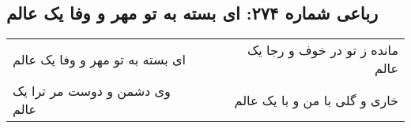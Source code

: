 \begin{center}
\section*{رباعی شماره ۲۷۴: ای بسته به تو مهر و وفا یک عالم}
\label{sec:sh274}
\begin{longtable}{l p{0.5cm} r}
ای بسته به تو مهر و وفا یک عالم
&&
مانده ز تو در خوف و رجا یک عالم
\\
وی دشمن و دوست مر ترا یک عالم
&&
خاری و گلی با من و با یک عالم
\\
\end{longtable}
\end{center}
